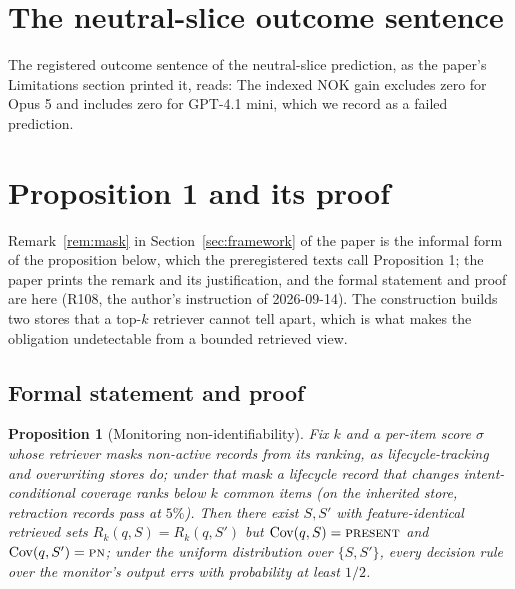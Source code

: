 \documentclass{article}
\newtheorem{proposition}{Proposition}
\newcommand{\present}{\textsc{present}}
\newcommand{\pn}{\textsc{pn}}
\begin{document}
\section{The neutral-slice outcome sentence}\label{sup:u6}

The registered outcome sentence of the neutral-slice prediction, as the paper's Limitations section printed it, reads:
The indexed NOK gain excludes zero for Opus 5 and includes zero for GPT-4.1 mini, which we record as a failed prediction.

\section{Proposition 1 and its proof}\label{sup:proof}

Remark~\ref{rem:mask} in Section~\ref{sec:framework} of the paper is the informal form of the proposition below, which the preregistered texts call Proposition 1; the paper prints the remark and its justification, and the formal statement and proof are here (R108, the author's instruction of 2026-09-14). The construction builds two stores that a top-$k$ retriever cannot tell apart, which is what makes the obligation undetectable from a bounded retrieved view.

\subsection{Formal statement and proof}

\begin{proposition}[Monitoring non-identifiability]\label{prop:nonident}
Fix $k$ and a per-item score $\sigma$ whose retriever masks non-active records from its ranking, as lifecycle-tracking and overwriting stores do; under that mask a lifecycle record that changes intent-conditional coverage ranks below $k$ common items (on the inherited store, retraction records pass at $5\%$). Then there exist $S,S'$ with feature-identical retrieved sets $R_k(q,S)=R_k(q,S')$ but $\mathrm{Cov}(q,S)=\present$ and $\mathrm{Cov}(q,S')=\pn$; under the uniform distribution over $\{S,S'\}$, every decision rule over the monitor's output errs with probability at least $1/2$.
\end{proposition}
\end{document}
